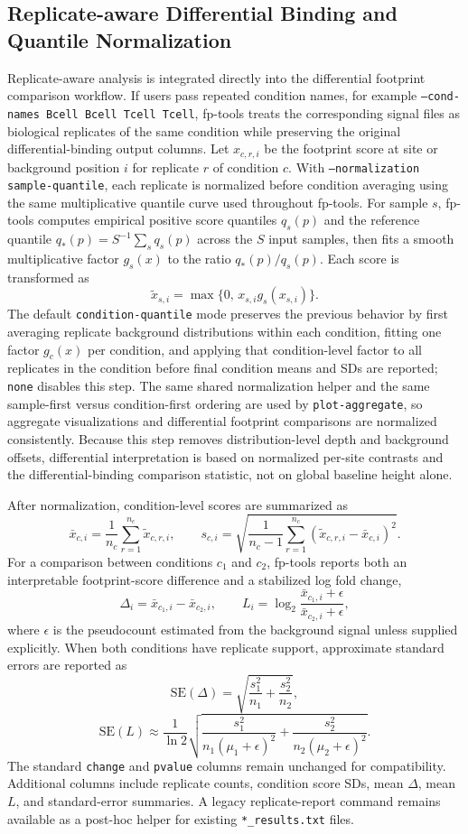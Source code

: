 \documentclass[biomedinformatics,article,submit,pdftex,moreauthors]{Definitions/mdpi}
\begin{document}
\subsection{Replicate-aware Differential Binding and Quantile Normalization}
\label{sec:replicate}

Replicate-aware analysis is integrated directly into the differential footprint comparison workflow.
If users pass repeated condition names, for example
\texttt{--cond-names Bcell Bcell Tcell Tcell}, fp-tools treats the corresponding
signal files as biological replicates of the same condition while preserving the
original differential-binding output columns. Let $x_{c,r,i}$ be the footprint score at
site or background position $i$ for replicate $r$ of condition $c$. With
\texttt{--normalization sample-quantile}, each replicate is normalized before
condition averaging using the same multiplicative quantile curve
used throughout fp-tools. For sample $s$, fp-tools computes empirical positive
score quantiles $q_s(p)$ and the reference quantile
$q_\ast(p)=S^{-1}\sum_s q_s(p)$ across the $S$ input samples, then fits a smooth
multiplicative factor $g_s(x)$ to the ratio $q_\ast(p)/q_s(p)$. Each score is
transformed as
\[
\tilde{x}_{s,i}=\max\{0,\,x_{s,i}g_s(x_{s,i})\}.
\]
The default \texttt{condition-quantile} mode preserves the previous behavior by
first averaging replicate background distributions within each condition, fitting
one factor $g_c(x)$ per condition, and applying that condition-level factor to
all replicates in the condition before final condition means and SDs are reported;
\texttt{none} disables this step. The same shared normalization helper and the
same sample-first versus condition-first ordering are used by
\texttt{plot-aggregate}, so aggregate visualizations and
differential footprint comparisons are normalized consistently. Because this
step removes distribution-level depth and background offsets, differential
interpretation is based on normalized per-site contrasts and the differential-binding
comparison statistic, not on global baseline height alone.

After normalization, condition-level scores are summarized as
\[
\bar{x}_{c,i}=\frac{1}{n_c}\sum_{r=1}^{n_c}\tilde{x}_{c,r,i},\qquad
s_{c,i}=\sqrt{\frac{1}{n_c-1}\sum_{r=1}^{n_c}(\tilde{x}_{c,r,i}-\bar{x}_{c,i})^2}.
\]
For a comparison between conditions $c_1$ and $c_2$, fp-tools reports both an
interpretable footprint-score difference and a stabilized log fold change,
\[
\Delta_i=\bar{x}_{c_1,i}-\bar{x}_{c_2,i},\qquad
L_i=\log_2\frac{\bar{x}_{c_1,i}+\epsilon}{\bar{x}_{c_2,i}+\epsilon},
\]
where $\epsilon$ is the pseudocount estimated from the background signal
unless supplied explicitly. When both conditions have replicate support, approximate
standard errors are reported as
\[
\mathrm{SE}(\Delta)=\sqrt{\frac{s_1^2}{n_1}+\frac{s_2^2}{n_2}},
\]
\[
\mathrm{SE}(L)\approx\frac{1}{\ln 2}
\sqrt{\frac{s_1^2}{n_1(\mu_1+\epsilon)^2}+
      \frac{s_2^2}{n_2(\mu_2+\epsilon)^2}}.
\]
The standard \texttt{change} and \texttt{pvalue} columns remain unchanged for
compatibility. Additional columns include replicate counts,
condition score SDs, mean $\Delta$, mean $L$, and standard-error summaries. A
legacy replicate-report command remains available as a post-hoc helper for
existing \texttt{*\_results.txt} files.
\end{document}
